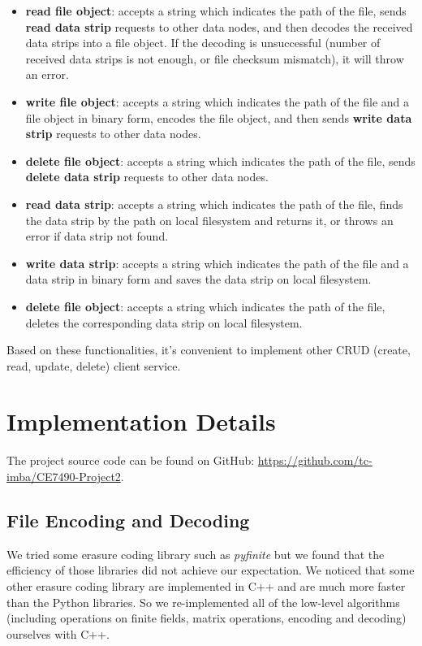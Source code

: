 \documentclass[conference]{IEEEtran}
\begin{document}
\begin{itemize}
    \item \textbf{read file object}: accepts a string which indicates the path of the file, sends \textbf{read data strip} requests to other data nodes, and then decodes the received data strips into a file object. If the decoding is unsuccessful (number of received data strips is not enough, or file checksum mismatch), it will throw an error.
    \item \textbf{write file object}: accepts a string which indicates the path of the file and a file object in binary form, encodes the file object, and then sends \textbf{write data strip} requests to other data nodes.
    \item \textbf{delete file object}: accepts a string which indicates the path of the file, sends \textbf{delete data strip} requests to other data nodes.
    \item \textbf{read data strip}: accepts a string which indicates the path of the file, finds the data strip by the path on local filesystem and returns it, or throws an error if data strip not found.
    \item \textbf{write data strip}: accepts a string which indicates the path of the file and a data strip in binary form and saves the data strip on local filesystem.
    \item \textbf{delete file object}: accepts a string which indicates the path of the file, deletes the corresponding data strip on local filesystem.
\end{itemize}

Based on these functionalities, it's convenient to implement other CRUD (create, read, update, delete) client service.

\section{Implementation Details}

The project source code can be found on GitHub: \url{https://github.com/tc-imba/CE7490-Project2}.

\subsection{File Encoding and Decoding}

We tried some erasure coding library such as \textit{pyfinite}\cite{Emin2018pyfinite} but we found that the efficiency of those libraries did not achieve our expectation. We noticed that some other erasure coding library are implemented in C++ and are much more faster than the Python libraries. So we re-implemented all of the low-level algorithms (including operations on finite fields, matrix operations, encoding and decoding) ourselves with C++.  
\end{document}
